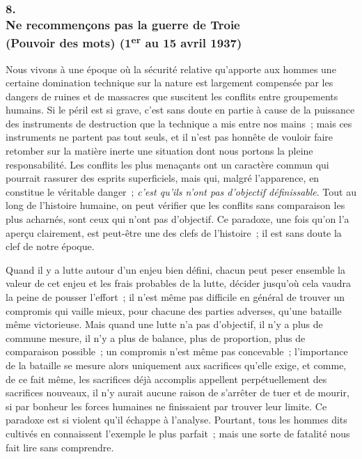 \documentclass[french,twoside]{book} %
\begin{document}
\subsubsection[8. Ne recommençons pas la guerre de Troie, (Pouvoir des mots) (1er au 15 avril 1937)]{8. \\
Ne recommençons pas la guerre de Troie \\
(Pouvoir des mots) (1\textsuperscript{er} au 15 avril 1937)}
\noindent \par
Nous vivons à une époque où la sécurité relative qu'apporte aux hommes une certaine domination technique sur la nature est largement compensée par les dangers de ruines et de massacres que suscitent les conflits entre grou­pements humains. Si le péril est si grave, c'est sans doute en partie à cause de la puissance des instruments de destruction que la technique a mis entre nos mains ; mais ces instruments ne partent pas tout seuls, et il n'est pas honnête de vouloir faire retomber sur la matière inerte une situation dont nous portons la pleine responsabilité. Les conflits les plus menaçants ont un caractère commun qui pourrait rassurer des esprits superficiels, mais qui, malgré l'apparence, en constitue le véritable danger ; {\itshape c'est qu'ils n'ont pas d'objectif définissable}. Tout au long de l'histoire humaine, on peut vérifier que les conflits sans comparaison les plus acharnés, sont ceux qui n'ont pas d'objectif. Ce paradoxe, une fois qu'on l'a aperçu clairement, est peut-être une des clefs de l'histoire ; il est sans doute la clef de notre époque.\par
Quand il y a lutte autour d'un enjeu bien défini, chacun peut peser ensemble la valeur de cet enjeu et les frais probables de la lutte, décider jusqu'où cela vaudra la peine de pousser l'effort ; il n'est même pas difficile en général de trouver un compromis qui vaille mieux, pour chacune des parties adverses, qu'une bataille même victorieuse. Mais quand une lutte n'a pas d'objectif, il n'y a plus de commune mesure, il n'y a plus de balance, plus de proportion, plus de comparaison possible ; un compromis n'est même pas concevable ; l'importance de la bataille se mesure alors uniquement aux sacri­fices qu'elle exige, et comme, de ce fait même, les sacrifices déjà accomplis appellent perpétuellement des sacrifices nouveaux, il n'y aurait aucune raison de s'arrêter de tuer et de mourir, si par bonheur les forces humaines ne finissaient par trouver leur limite. Ce paradoxe est si violent qu'il échappe à l'analyse. Pourtant, tous les hommes dits cultivés en connaissent l'exemple le plus parfait ; mais une sorte de fatalité nous fait lire sans comprendre.\par
\end{document}
